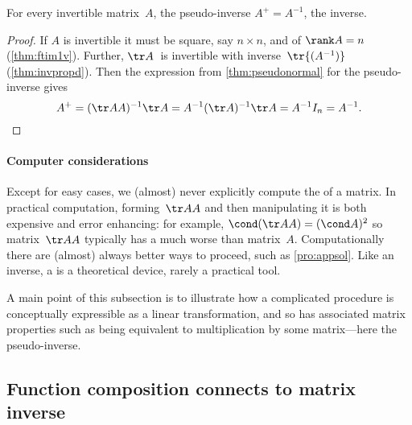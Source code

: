 \begin{theorem} \label{thm:pinvinv}
For every invertible matrix~\(A\), the pseudo-inverse \(A^+=A^{-1}\), the inverse.
\end{theorem}
\begin{proof} 
If \(A\) is invertible it must be square, say \(n\times n\), and of \(\rank A=n\) (\autoref{thm:ftim1v}).
Further, \(\tr A\)~is invertible with inverse~\(\tr{(A^{-1})}\) (\autoref{thm:invpropd}).
Then the expression from \autoref{thm:pseudonormal} for the pseudo-inverse gives
\begin{equation*}
A^+=(\tr AA)^{-1}\tr A
=A^{-1}(\tr A)^{-1}\tr A
=A^{-1}I_n=A^{-1}.
\end{equation*}
\end{proof}




\paragraph{Computer considerations} 
Except for easy cases, we (almost) never explicitly compute the  of a matrix.
In practical computation, forming~\(\tr AA\) and then manipulating it is both expensive and error enhancing: for example, \(\cond(\tr AA)=(\cond A)^2\) so matrix~\(\tr AA\) typically has a much worse  than matrix~\(A\).
Computationally there are (almost) always better ways to proceed, such as \autoref{pro:appsol}.
Like an inverse, a  is a theoretical device, rarely a practical tool.

A main point of this subsection is to illustrate how a complicated procedure is conceptually expressible as a linear transformation, and so has associated matrix properties such as being equivalent to multiplication by some matrix---here the pseudo-inverse.







\begin{comment}
connect to normal equation?  Possibly establish the Penrose conditions, \(AA^+A=A\), \(A^+AA^+=A^+\), and \(AA^+\) and \(A^+A\) are symmetric, but as yet I do not see any need.
\end{comment}







\subsection{Function composition connects to matrix inverse}


